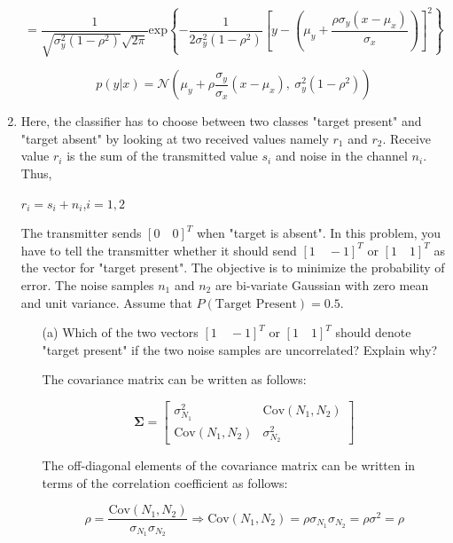 \documentclass[fleqn]{article}
\begin{document}
\begin{enumerate}
		\begin{equation*}		
			= \frac{1}{\sqrt{\sigma_y^2(1-\rho^2)}\sqrt{2\pi}}\text{exp}\left\{-\frac{1}{2\sigma_y^2(1-\rho^2)}\left[y - \left(\mu_y + \frac{\rho\sigma_y(x-\mu_x)}{\sigma_x}\right)\right]^2\right\}
		\end{equation*}
		
		\begin{equation*}
			p(y|x) = \mathcal{N}\left(\mu_y + \rho\frac{\sigma_y}{\sigma_x}(x-\mu_x),\:\sigma_y^2(1 - \rho^2)\right)
		\end{equation*}
		
		\item Here, the classifier has to choose between two classes "target present" and "target absent" by looking at two received values namely $r_1$ and $r_2$. Receive value $r_i$ is the sum of the transmitted value $s_i$ and noise in the channel $n_i$. Thus,
		
		$r_i = s_i + n_i$,\quad$i=1,2$
		
		The transmitter sends $[0 \quad 0]^T$ when "target is absent". In this problem, you have to tell the transmitter whether it should send $[1 \quad -1]^T$ or $ [1 \quad 1]^T$ as the vector for "target present". The objective is to minimize the probability of error. The noise samples $n_1$ and $n_2$ are bi-variate Gaussian with zero mean and unit variance. Assume that $P(\text{Target Present}) = 0.5$.
		
		\begin{enumerate}
			\item[(a)] Which of the two vectors $[1 \quad -1]^T$ or $[1 \quad 1]^T$ should denote "target present" if the two noise samples are uncorrelated? Explain why?
			
			The covariance matrix can be written as follows:
			
			\begin{equation*}
				\mathbf{\Sigma} = \begin{bmatrix}
					\sigma_{N_1}^2 & \text{Cov}(N_1,N_2) \\
					\text{Cov}(N_1,N_2) & \sigma_{N_2}^2
				\end{bmatrix}
			\end{equation*}
			
			The off-diagonal elements of the covariance matrix can be written in terms of the correlation coefficient as follows:
			 
			\begin{equation*}
				\rho = \frac{\text{Cov}(N_1,N_2)}{\sigma_{N_1}\sigma_{N_2}} \Rightarrow \text{Cov}(N_1,N_2) = \rho\sigma_{N_1}\sigma_{N_2} = \rho\sigma^2 = \rho
			\end{equation*}
			

\end{enumerate}
\end{enumerate}
\end{document}
